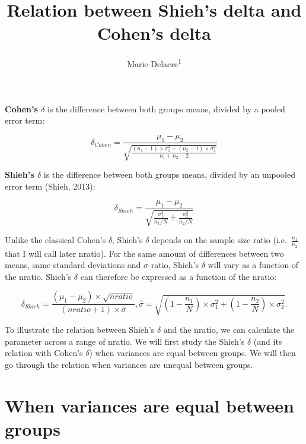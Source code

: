 \documentclass[man]{apa6}
\title{Relation between Shieh's delta and Cohen's delta}
\author{Marie Delacre\textsuperscript{1}}
\date{}
\affiliation{
\vspace{0.5cm}
\textsuperscript{1} Université Libre de Bruxelles, Service of Analysis of the Data (SAD), Bruxelles, Belgium}
\begin{document}
\maketitle

\textbf{Cohen's \(\delta\)} is the difference between both groups means, divided by a pooled error term:

\begin{equation} 
\delta_{Cohen}= \frac{\mu_{1}-\mu_{2}}{\sqrt{\frac{(n_{1}-1) \times \sigma^2_{1} + (n_{2}-1) \times \sigma^2_{2}}{n_{1}+n_{2}-2}}}
\label{eq:cohend}
\end{equation}

\textbf{Shieh's \(\delta\)} is the difference between both groups means, divided by an unpooled error term (Shieh, 2013):

\begin{equation} 
\delta_{Shieh}= \frac{\mu_{1}-\mu_{2}} {\sqrt{\frac{\sigma_1^2}{n_1/N}+\frac{\sigma_2^2}{n_2/N}}}
\label{eq:shiehs}
\end{equation}

Unlike the classical Cohen's \(\delta\), Shieh's \(\delta\) depends on the sample size ratio (i.e.~\(\frac{n_1}{n_2}\) that I will call later nratio). For the same amount of differences between two means, same standard deviations and \(\sigma\)-ratio, Shieh's \(\delta\) will vary as a function of the nratio. Shieh's \(\delta\) can therefore be expressed as a function of the nratio:

\begin{equation} 
\delta_{Shieh}= \frac{(\mu_1-\mu_2) \times \sqrt{nratio}}{(nratio+1) \times \hat{\sigma}}
,\hat{\sigma} = \sqrt{(1-\frac{n_1}{N}) \times \sigma_1^2+(1-\frac{n_2}{N}) \times \sigma_2^2}. 
\label{eq:shieh}
\end{equation}

To illustrate the relation between Shieh's \(\delta\) and the nratio, we can calculate the parameter across a range of nratio. We will first study the Shieh's \(\delta\) (and its relation with Cohen's \(\delta\)) when variances are equal between groups. We will then go through the relation when variances are unequal between groups.

\hypertarget{when-variances-are-equal-between-groups}{%
\section{When variances are equal between groups}\label{when-variances-are-equal-between-groups}}
\end{document}
